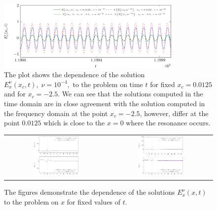 \begin{figure}
 \includegraphics[width=0.8\textwidth]{pics_time_domain/res/ex_fixed_x_nu1e4-crop.pdf}
 \caption{The plot shows the dependence of the solution $E_x^{\nu}(x_c,t),\;\nu=10^{-4},$ to 
 the problem  on time $t$ for fixed 
 $x_c=0.0125$ and for $x_c=-2.5$. We can see that the solutions computed in the time domain are in close agreement 
 with the solution computed in the frequency domain at the point $x_c=-2.5$, however, differ at the point $0.0125$ which is 
 close to the $x=0$ where the resonance occurs.}
 \label{fig:resonance_nus_ex_x}
\end{figure}
\begin{figure}
\begin{tabular}{cc}
\includegraphics[width=0.45\textwidth]{pics_time_domain/res/ex_fixed_t-crop.pdf}&
\includegraphics[width=0.45\textwidth]{pics_time_domain/res/ex_fixed_t_1e3-crop.pdf}
\end{tabular}
\caption{The figures demonstrate the dependence of the solutions 
$E_x^{\nu}(x,t)$ to the problem  on $x$ for fixed values of $t$. }
\label{fig:resonance_nus_ex_t}
\end{figure}
